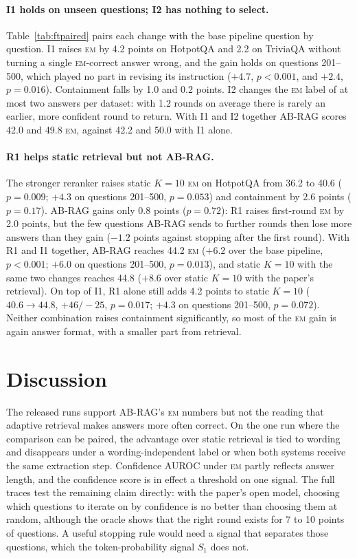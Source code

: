 \documentclass[11pt]{article}
\newcommand{\EM}{\textsc{em}}
\begin{document}
\paragraph{I1 holds on unseen questions; I2 has nothing to select.} Table~\ref{tab:ftpaired} pairs each change with the base pipeline question by question. I1 raises \EM{} by 4.2 points on HotpotQA and 2.2 on TriviaQA without turning a single \EM{}-correct answer wrong, and the gain holds on questions 201--500, which played no part in revising its instruction ($+4.7$, $p<0.001$, and $+2.4$, $p=0.016$). Containment falls by 1.0 and 0.2 points. I2 changes the \EM{} label of at most two answers per dataset: with 1.2 rounds on average there is rarely an earlier, more confident round to return. With I1 and I2 together AB-RAG scores 42.0 and 49.8 \EM{}, against 42.2 and 50.0 with I1 alone.

\paragraph{R1 helps static retrieval but not AB-RAG.} The stronger reranker raises static $K=10$ \EM{} on HotpotQA from 36.2 to 40.6 ($p=0.009$; $+4.3$ on questions 201--500, $p=0.053$) and containment by 2.6 points ($p=0.17$). AB-RAG gains only 0.8 points ($p=0.72$): R1 raises first-round \EM{} by 2.0 points, but the few questions AB-RAG sends to further rounds then lose more answers than they gain ($-1.2$ points against stopping after the first round). With R1 and I1 together, AB-RAG reaches 44.2 \EM{} ($+6.2$ over the base pipeline, $p<0.001$; $+6.0$ on questions 201--500, $p=0.013$), and static $K=10$ with the same two changes reaches 44.8 ($+8.6$ over static $K=10$ with the paper's retrieval). On top of I1, R1 alone still adds 4.2 points to static $K=10$ ($40.6 \to 44.8$, $+46/-25$, $p=0.017$; $+4.3$ on questions 201--500, $p=0.072$). Neither combination raises containment significantly, so most of the \EM{} gain is again answer format, with a smaller part from retrieval.

\section{Discussion}

The released runs support AB-RAG's \EM{} numbers but not the reading that adaptive retrieval makes answers more often correct. On the one run where the comparison can be paired, the advantage over static retrieval is tied to wording and disappears under a wording-independent label or when both systems receive the same extraction step. Confidence AUROC under \EM{} partly reflects answer length, and the confidence score is in effect a threshold on one signal. The full traces test the remaining claim directly: with the paper's open model, choosing which questions to iterate on by confidence is no better than choosing them at random, although the oracle shows that the right round exists for 7 to 10 points of questions. A useful stopping rule would need a signal that separates those questions, which the token-probability signal $S_1$ does not.
\end{document}
